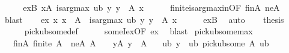 \begin{isabellebody}
%
\isadelimproof
%
\endisadelimproof
%
\isatagproof
{}\isamarkupfalse%
\ {\isacharminus}{\kern0pt}\isanewline
\ \ \isamarkupfalse%
\ exB{\isacharcolon}{\kern0pt}\ {\isachardoublequoteopen}{\isasymexists}x{\isasymin}A{\isachardot}{\kern0pt}\ is{\isacharunderscore}{\kern0pt}arg{\isacharunderscore}{\kern0pt}max\ ub\ {\isacharparenleft}{\kern0pt}{\isasymlambda}y{\isachardot}{\kern0pt}\ y\ {\isasymin}\ A{\isacharparenright}{\kern0pt}\ x{\isachardoublequoteclose}\isanewline
\ \ \ \ \isamarkupfalse%
\ finite{\isacharunderscore}{\kern0pt}is{\isacharunderscore}{\kern0pt}arg{\isacharunderscore}{\kern0pt}max{\isacharunderscore}{\kern0pt}in{\isacharbrackleft}{\kern0pt}OF\ finA\ neA{\isacharbrackright}{\kern0pt}\ \isamarkupfalse%
\ blast\isanewline
\ \ \isamarkupfalse%
\ ex{\isacharcolon}{\kern0pt}\ {\isachardoublequoteopen}{\isasymexists}x{\isachardot}{\kern0pt}\ x\ {\isasymin}\ A\ {\isasymand}\ is{\isacharunderscore}{\kern0pt}arg{\isacharunderscore}{\kern0pt}max\ ub\ {\isacharparenleft}{\kern0pt}{\isasymlambda}y{\isachardot}{\kern0pt}\ y\ {\isasymin}\ A{\isacharparenright}{\kern0pt}\ x{\isachardoublequoteclose}\isanewline
\ \ \ \ \isamarkupfalse%
\ exB\ \isamarkupfalse%
\ auto\isanewline
\ \ \isamarkupfalse%
\ {\isacharquery}{\kern0pt}thesis\isanewline
\ \ \ \ \isamarkupfalse%
\ pick{\isacharunderscore}{\kern0pt}ub{\isacharunderscore}{\kern0pt}some{\isacharunderscore}{\kern0pt}def\isanewline
\ \ \ \ \isamarkupfalse%
\ someI{\isacharunderscore}{\kern0pt}ex{\isacharbrackleft}{\kern0pt}OF\ ex{\isacharbrackright}{\kern0pt}\ \isamarkupfalse%
\ blast\isanewline
{}\isamarkupfalse%
%
\endisatagproof
{\isafoldproof}%
%
\isadelimproof
\isanewline
%
\endisadelimproof
\isanewline
{}\isamarkupfalse%
\ pick{\isacharunderscore}{\kern0pt}ub{\isacharunderscore}{\kern0pt}some{\isacharunderscore}{\kern0pt}max{\isacharcolon}{\kern0pt}\isanewline
\ \ \ finA{\isacharcolon}{\kern0pt}\ {\isachardoublequoteopen}finite\ A{\isachardoublequoteclose}\ \ neA{\isacharcolon}{\kern0pt}\ {\isachardoublequoteopen}A\ {\isasymnoteq}\ {\isacharbraceleft}{\kern0pt}{\isacharbraceright}{\kern0pt}{\isachardoublequoteclose}\ \ yA{\isacharcolon}{\kern0pt}\ {\isachardoublequoteopen}y\ {\isasymin}\ A{\isachardoublequoteclose}\isanewline
\ \ \ {\isachardoublequoteopen}ub\ y\ {\isasymle}\ ub\ {\isacharparenleft}{\kern0pt}pick{\isacharunderscore}{\kern0pt}ub{\isacharunderscore}{\kern0pt}some\ A\ ub{\isacharparenright}{\kern0pt}{\isachardoublequoteclose}\isanewline

\end{isabellebody}
